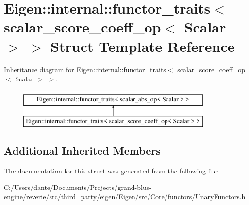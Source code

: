 \hypertarget{struct_eigen_1_1internal_1_1functor__traits_3_01scalar__score__coeff__op_3_01_scalar_01_4_01_4}{}\section{Eigen\+::internal\+::functor\+\_\+traits$<$ scalar\+\_\+score\+\_\+coeff\+\_\+op$<$ Scalar $>$ $>$ Struct Template Reference}
\label{struct_eigen_1_1internal_1_1functor__traits_3_01scalar__score__coeff__op_3_01_scalar_01_4_01_4}
Inheritance diagram for Eigen\+::internal\+::functor\+\_\+traits$<$ scalar\+\_\+score\+\_\+coeff\+\_\+op$<$ Scalar $>$ $>$\+:\begin{figure}[H]
\begin{center}
\leavevmode
\includegraphics[height=2.000000cm]{struct_eigen_1_1internal_1_1functor__traits_3_01scalar__score__coeff__op_3_01_scalar_01_4_01_4}
\end{center}
\end{figure}
\subsection*{Additional Inherited Members}


The documentation for this struct was generated from the following file\+:\begin{DoxyCompactItemize}
\item 
C\+:/\+Users/dante/\+Documents/\+Projects/grand-\/blue-\/engine/reverie/src/third\+\_\+party/eigen/\+Eigen/src/\+Core/functors/Unary\+Functors.\+h\end{DoxyCompactItemize}
